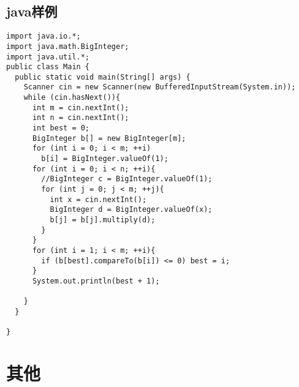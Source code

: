 \subsection{java样例}
\begin{lstlisting}[language={}]
import java.io.*;
import java.math.BigInteger;
import java.util.*;
public class Main {
  public static void main(String[] args) {
    Scanner cin = new Scanner(new BufferedInputStream(System.in));
    while (cin.hasNext()){
      int m = cin.nextInt();
      int n = cin.nextInt();
      int best = 0;
      BigInteger b[] = new BigInteger[m];
      for (int i = 0; i < m; ++i)
        b[i] = BigInteger.valueOf(1);
      for (int i = 0; i < n; ++i){
        //BigInteger c = BigInteger.valueOf(1);
        for (int j = 0; j < m; ++j){
          int x = cin.nextInt();
          BigInteger d = BigInteger.valueOf(x);
          b[j] = b[j].multiply(d);
        }
      }
      for (int i = 1; i < m; ++i){
        if (b[best].compareTo(b[i]) <= 0) best = i;
      }
      System.out.println(best + 1);
      
    }
  }

}
\end{lstlisting}

\section{其他}
